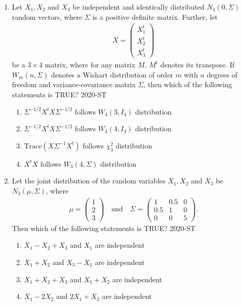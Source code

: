 \documentclass[journal]{IEEEtran}
\begin{document}
\begin{enumerate}
\item Let $X_1, X_2$ and $X_3$ be independent and identically distributed $N_4(0, \Sigma)$ random vectors, where $\Sigma$ is a positive definite matrix. Further, let 
\begin{align*}
X = \begin{pmatrix} X_1^t \\ X_2^t \\ X_3^t \end{pmatrix}
\end{align*}
be a $3 \times 4$ matrix, where for any matrix $M$, $M^t$ denotes its transpose. If $W_m(n, \Sigma)$ denotes a Wishart distribution of order $m$ with $n$ degrees of freedom and variance-covariance matrix $\Sigma$, then which of the following statements is TRUE?
\hfill{2020-ST}
\begin{enumerate}
    \item $\Sigma^{-1/2} X^t X \Sigma^{-1/2}$ follows $W_4(3, I_4)$ distribution
    \item $\Sigma^{-1/2} X^t X \Sigma^{-1/2}$ follows $W_3(4, I_3)$ distribution
    \item $\text{Trace} (X \Sigma^{-1} X^t)$ follows $\chi^2_3$ distribution
    \item $X^t X$ follows $W_3(4, \Sigma)$ distribution
\end{enumerate}

\item Let the joint distribution of the random variables $X_1, X_2$ and $X_3$ be $N_3(\mu, \Sigma)$, where 
\begin{align*}
\mu = \begin{pmatrix} 1 \\ 2 \\ 3 \end{pmatrix} \quad \text{and} \quad \Sigma = \begin{pmatrix} 1 & 0.5 & 0 \\ 0.5 & 1 & 0 \\ 0 & 0 & 5 \end{pmatrix}.
\end{align*}
Then which of the following statements is TRUE?
\hfill{2020-ST}
\begin{enumerate}
    \item $X_1 - X_2 + X_3$ and $X_1$ are independent
    \item $X_1 + X_2$ and $X_3 - X_1$ are independent
    \item $X_1 + X_2 + X_3$ and $X_1 + X_2$ are independent
    \item $X_1 - 2X_2$ and $2X_1 + X_2$ are independent
\end{enumerate}


\end{enumerate}
\end{document}
